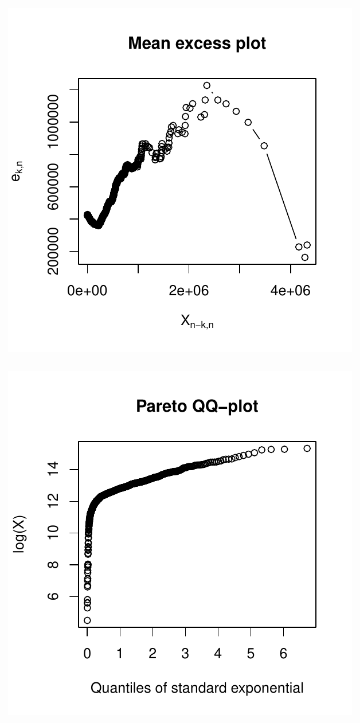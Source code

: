 \begin{figure}[hh!]
\begin{subfigure}[t]{0.45\textwidth}
		\includegraphics[width=\textwidth]{./plots/MeanExcess.pdf}
	\end{subfigure}
		\begin{subfigure}[t]{0.45\textwidth}
		\includegraphics[width=\textwidth]{./plots/ParetoQQ.pdf}

\end{subfigure}
\end{figure}
